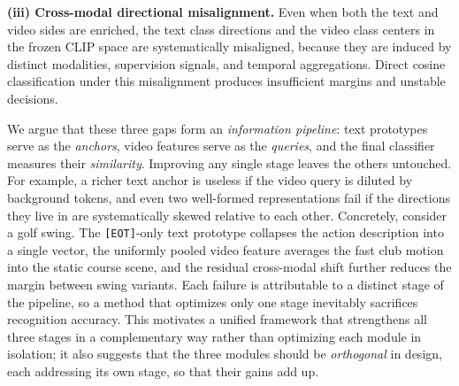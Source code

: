 \textbf{(iii) Cross-modal directional misalignment.}
Even when both the text and video sides are enriched, the text class directions and the video class centers in the frozen CLIP space are systematically misaligned, because they are induced by distinct modalities, supervision signals, and temporal aggregations.
Direct cosine classification under this misalignment produces insufficient margins and unstable decisions.

We argue that these three gaps form an \emph{information pipeline}: text prototypes serve as the \emph{anchors}, video features serve as the \emph{queries}, and the final classifier measures their \emph{similarity}.
Improving any single stage leaves the others untouched.
For example, a richer text anchor is useless if the video query is diluted by background tokens, and even two well-formed representations fail if the directions they live in are systematically skewed relative to each other.
Concretely, consider a golf swing. The \texttt{[EOT]}-only text prototype collapses the action description into a single vector, the uniformly pooled video feature averages the fast club motion into the static course scene, and the residual cross-modal shift further reduces the margin between swing variants.
Each failure is attributable to a distinct stage of the pipeline, so a method that optimizes only one stage inevitably sacrifices recognition accuracy.
This motivates a unified framework that strengthens all three stages in a complementary way rather than optimizing each module in isolation; it also suggests that the three modules should be \emph{orthogonal} in design, each addressing its own stage, so that their gains add up.

